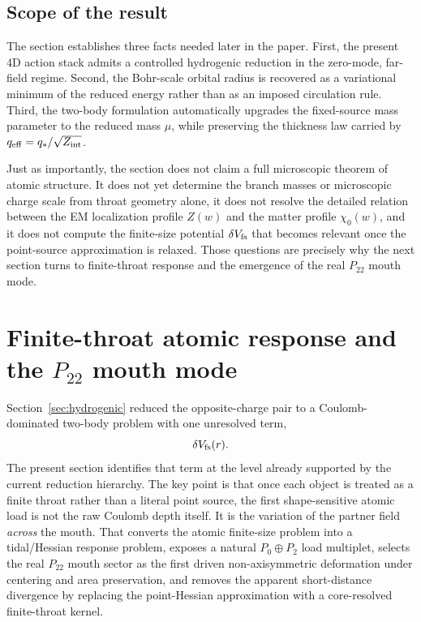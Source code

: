 \documentclass[11pt]{article}
\theoremstyle{plain}
\theoremstyle{definition}
\theoremstyle{remark}
\newcommand{\Ptwotwo}{P_{22}}
\newcommand{\qeff}{q_{\mathrm{eff}}}
\newcommand{\qstar}{q_*}
\begin{document}
\subsection{Scope of the result}\label{subsec:hydrogenic-scope}

The section establishes three facts needed later in the paper. First, the present 4D action stack admits a controlled hydrogenic reduction in the zero-mode, far-field regime. Second, the Bohr-scale orbital radius is recovered as a variational minimum of the reduced energy rather than as an imposed circulation rule. Third, the two-body formulation automatically upgrades the fixed-source mass parameter to the reduced mass $\mu$, while preserving the thickness law carried by $\qeff=\qstar/\sqrt{Z_{\rm int}}$.

Just as importantly, the section does not claim a full microscopic theorem of atomic structure. It does not yet determine the branch masses or microscopic charge scale from throat geometry alone, it does not resolve the detailed relation between the EM localization profile $Z(w)$ and the matter profile $\chi_0(w)$, and it does not compute the finite-size potential $\delta V_{\rm fs}$ that becomes relevant once the point-source approximation is relaxed. Those questions are precisely why the next section turns to finite-throat response and the emergence of the real $\Ptwotwo$ mouth mode.


\section{Finite-throat atomic response and the \texorpdfstring{$\Ptwotwo$}{P22} mouth mode}\label{sec:finite-response}

Section~\ref{sec:hydrogenic} reduced the opposite-charge pair to a Coulomb-dominated two-body problem with one unresolved term,
\begin{equation}
\delta V_{\rm fs}(r).
\label{eq:finite-unresolved-fs}
\end{equation}
The present section identifies that term at the level already supported by the current reduction hierarchy. The key point is that once each object is treated as a finite throat rather than a literal point source, the first shape-sensitive atomic load is not the raw Coulomb depth itself. It is the variation of the partner field \emph{across} the mouth. That converts the atomic finite-size problem into a tidal/Hessian response problem, exposes a natural \(P_0\oplus P_2\) load multiplet, selects the real \(\Ptwotwo\) mouth sector as the first driven non-axisymmetric deformation under centering and area preservation, and removes the apparent short-distance divergence by replacing the point-Hessian approximation with a core-resolved finite-throat kernel.
\end{document}
